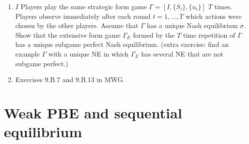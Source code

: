 \documentclass[a4paper,12pt]{article}
\begin{document}
\begin{enumerate}
\item $I$ Players play the same strategic form game $\Gamma=[I,\{S_i\},\{u_i\}]$ $T$ times. Players observe immediately after each round $t=1,\dots, T$ which actions were chosen by the other players. Assume that $\Gamma$ has a unique Nash equilibrium $\sigma$. Show that the extensive form game $\Gamma_E$ formed by the $T$ time repetition of $\Gamma$ has a unique subgame perfect Nash equilibrium. (extra exercise: find an example $\Gamma$ with a unique NE in which $\Gamma_E$ has several NE that are not subgame perfect.)
  \item Exercises 9.B.7 and 9.B.13 in MWG.
\end{enumerate}

\section{Weak PBE and sequential equilibrium}
\label{sec:weak-pbe-sequential}
\end{document}
